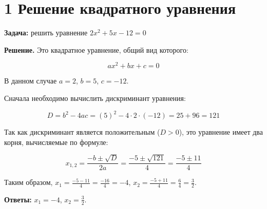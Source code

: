 \documentclass{article}
\begin{document}
\section*{1 Решение квадратного уравнения}

\textbf{Задача:} решить уравнение \(2x^2 + 5x - 12 = 0\)

\textbf{Решение.} Это квадратное уравнение, общий вид которого:

\[ax^2 + bx + c = 0\]

В данном случае \(a = 2\), \(b = 5\), \(c = -12\).

Сначала необходимо вычислить дискриминант уравнения:

\[D = b^2 - 4ac = (5)^2 - 4 \cdot 2 \cdot (-12) = 25 + 96 = 121\]

Так как дискриминант является положительным (\(D > 0\)), это уравнение имеет два корня, вычисляемые по формуле:

\[x_{1,2} = \frac{-b \pm \sqrt{D}}{2a} = \frac{-5 \pm \sqrt{121}}{4} = \frac{-5 \pm 11}{4}\]

Таким образом, \(x_1 = \frac{-5 - 11}{4} = \frac{-16}{4} = -4\), \(x_2 = \frac{-5 + 11}{4} = \frac{6}{4} = \frac{3}{2}\).

\textbf{Ответы:}  
\(x_1 = -4\), \(x_2 = \frac{3}{2}\).
\end{document}
